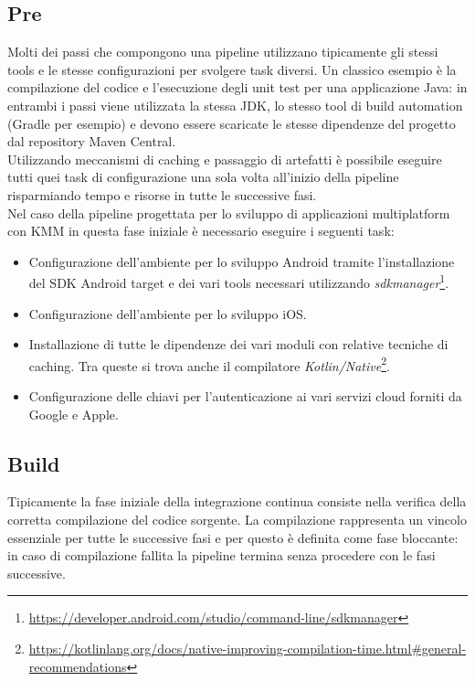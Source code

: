 \subsection{Pre}
Molti dei passi che compongono una pipeline utilizzano tipicamente gli stessi tools e le stesse configurazioni per svolgere task diversi. Un classico esempio è la compilazione del codice e l'esecuzione degli unit test per una applicazione Java: in entrambi i passi viene utilizzata la stessa JDK, lo stesso tool di build automation (Gradle per esempio) e devono essere scaricate le stesse dipendenze del progetto dal repository Maven Central.\\
Utilizzando meccanismi di caching e passaggio di artefatti è possibile eseguire tutti quei task di configurazione una sola volta all'inizio della pipeline risparmiando tempo e risorse in tutte le successive fasi.\\
Nel caso della pipeline progettata per lo sviluppo di applicazioni multiplatform con KMM in questa fase iniziale è necessario eseguire i seguenti task:
\begin{itemize}
    \item Configurazione dell'ambiente per lo sviluppo Android tramite l'installazione del SDK Android target e dei vari tools necessari utilizzando \textit{sdkmanager}\footnote{\url{https://developer.android.com/studio/command-line/sdkmanager}}.
    \item Configurazione dell'ambiente per lo sviluppo iOS.
    \item Installazione di tutte le dipendenze dei vari moduli con relative tecniche di caching. Tra queste si trova anche il compilatore \textit{Kotlin/Native}\footnote{\url{https://kotlinlang.org/docs/native-improving-compilation-time.html\#general-recommendations}}.
    \item Configurazione delle chiavi per l'autenticazione ai vari servizi cloud forniti da Google e Apple.
\end{itemize}

\subsection{Build}
Tipicamente la fase iniziale della integrazione continua consiste nella verifica della corretta compilazione del codice sorgente. La compilazione rappresenta un vincolo essenziale per tutte le successive fasi e per questo è definita come fase bloccante: in caso di compilazione fallita la pipeline termina senza procedere con le fasi successive.

